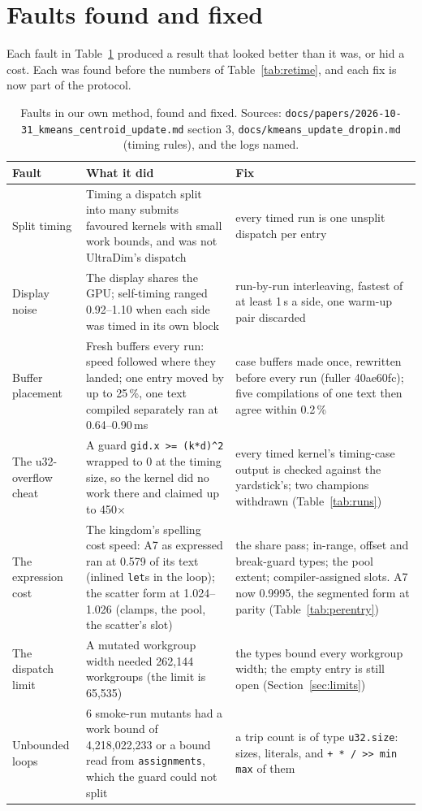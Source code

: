 \documentclass[sigconf,nonacm]{acmart}
\newcommand{\code}[1]{\nolinkurl{#1}}
\newcommand{\src}[1]{{\footnotesize\nolinkurl{#1}}}
\begin{document}
\section{Faults found and fixed}
\label{sec:faults}

Each fault in Table~\ref{tab:faults} produced a result that looked better
than it was, or hid a cost. Each was found before the numbers of
Table~\ref{tab:retime}, and each fix is now part of the protocol.

\begin{table}[t]
\caption{Faults in our own method, found and fixed. Sources:
\src{docs/papers/2026-10-31_kmeans_centroid_update.md} section 3,
\src{docs/kmeans_update_dropin.md} (timing rules), and the logs named.}
\label{tab:faults}
\small
\begin{tabularx}{\textwidth}{@{}p{3.2cm}XX@{}}
\toprule
Fault & What it did & Fix\\
\midrule
Split timing & Timing a dispatch split into many submits favoured kernels with small work bounds, and was not UltraDim's dispatch & every timed run is one unsplit dispatch per entry\\
Display noise & The display shares the GPU; self-timing ranged 0.92--1.10 when each side was timed in its own block & run-by-run interleaving, fastest of at least 1\,s a side, one warm-up pair discarded\\
Buffer placement & Fresh buffers every run: speed followed where they landed; one entry moved by up to 25\,\%, one text compiled separately ran at 0.64--0.90\,ms & case buffers made once, rewritten before every run (fuller 40ae60fc); five compilations of one text then agree within 0.2\,\%\\
The u32-overflow cheat & A guard \code{gid.x >= (k*d)^2} wrapped to 0 at the timing size, so the kernel did no work there and claimed up to 450$\times$ & every timed kernel's timing-case output is checked against the yardstick's; two champions withdrawn (Table~\ref{tab:runs})\\
The expression cost & The kingdom's spelling cost speed: A7 as expressed ran at 0.579 of its text (inlined \code{let}s in the loop); the scatter form at 1.024--1.026 (clamps, the pool, the scatter's slot) & the share pass; in-range, offset and break-guard types; the pool extent; compiler-assigned slots. A7 now 0.9995, the segmented form at parity (Table~\ref{tab:perentry})\\
The dispatch limit & A mutated workgroup width needed 262,144 workgroups (the limit is 65,535) & the types bound every workgroup width; the empty entry is still open (Section~\ref{sec:limits})\\
Unbounded loops & 6 smoke-run mutants had a work bound of 4,218,022,233 or a bound read from \code{assignments}, which the guard could not split & a trip count is of type \code{u32.size}: sizes, literals, and \code{+ * / >> min max} of them\\
\bottomrule
\end{tabularx}
\end{table}
\end{document}
